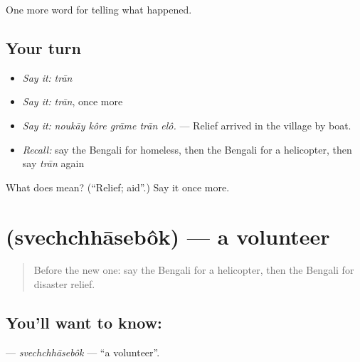 \begin{grammarlens}[title={What you've built}]
One more word for telling what happened.
\end{grammarlens}

\subsection*{Your turn}
\begin{itemize}
\raggedright
  \item \emph{Say it:} \emph{trān}
  \item \emph{Say it:} \emph{trān}, once more
  \item \emph{Say it:} \emph{noukāy kôre grāme trān elô.} — Relief arrived in the village by boat.
  \item \emph{Recall:} say the Bengali for homeless, then the Bengali for a helicopter, then say \emph{trān} again
\end{itemize}

\begin{tcolorbox}[breakable,colback=teal!4,colframe=teal!35!black,title={Before you move on}]
What does  mean? (\textquotedblleft{}Relief; aid\textquotedblright{}.) Say it once more.
\end{tcolorbox}
\section[\texorpdfstring{\bn{স্বেচ্ছাসেবক} (svechchhāsebôk)}{স্বেচ্ছাসেবক (svechchhāsebôk)}]{ (svechchhāsebôk) — a volunteer}

\label{lesson:BN-C291-svechchhasebok}



\begin{quote}
Before the new one: say the Bengali for a helicopter, then the Bengali for disaster relief.
\end{quote}

\subsection*{You'll want to know: }
\textbf{} — \emph{svechchhāsebôk} — \textquotedblleft{}a volunteer\textquotedblright{}.

\begin{quote}
      
\end{quote}

